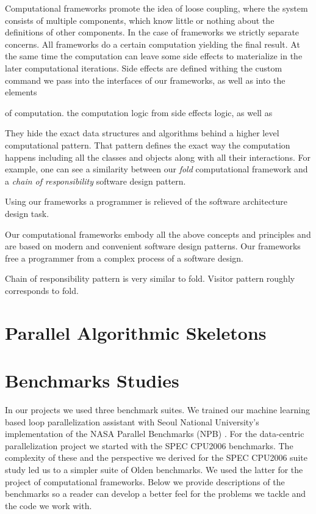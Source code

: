 Computational frameworks promote the idea of loose coupling, where the system consists of multiple components, which know little or nothing about the definitions of other components. In the case of frameworks we strictly separate concerns. All frameworks do a certain computation yielding the final result. At the same time the computation can leave some side effects to materialize in the later computational iterations. Side effects are defined withing the custom command we pass into the interfaces of our frameworks, as well as into the elements  


of computation.  the computation logic from side effects logic, as well as    


They hide the exact data structures and algorithms behind a higher level computational pattern. That pattern defines the exact way the computation happens including all the classes and objects along with all their interactions. For example, one can see a similarity between our \textit{fold} computational framework and a \textit{chain of responsibility} software design pattern.

Using our frameworks a programmer is relieved of the software architecture design task.


Our computational frameworks embody all the above concepts and principles and are based on modern and convenient software design patterns. Our frameworks free a programmer from a complex process of a software design.  

Chain of responsibility pattern is very similar to fold.
Visitor pattern roughly corresponds to fold.

\section{Parallel Algorithmic Skeletons}

\section{Benchmarks Studies}
\label{background_benchmarks}
\quad In our projects we used three benchmark suites. We trained our machine learning based loop parallelization assistant with Seoul National University's implementation of the NASA Parallel Benchmarks (NPB) \cite{snu-npb-benchmarks}. For the data-centric parallelization project we started with the SPEC CPU2006 benchmarks. The complexity of these and the perspective we derived for the SPEC CPU2006 suite study led us to a simpler suite of Olden benchmarks. We used the latter for the project of computational frameworks.\newline\null
\quad Below we provide descriptions of the benchmarks so a reader can develop a better feel for the problems we tackle and the code we work with.\newline\null
